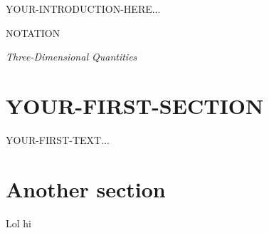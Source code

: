 \documentclass[10pt]{report}
\begin{document}
\thispagestyle{firstpage}
\maketitlepage

YOUR-INTRODUCTION-HERE...

\newpage
\tableofcontents
\newpage

\pagestyle{plain}
\begin{center}
  \LARGE NOTATION
\end{center}
\hrulefill
\begin{center}
  \textit{Three-Dimensional Quantities}
\end{center}

\newpage
\section{YOUR-FIRST-SECTION}

YOUR-FIRST-TEXT...

\section{Another section}


Lol hi
\appendix
\end{document}
